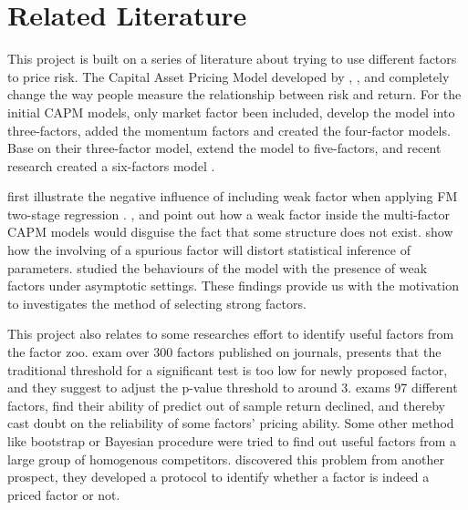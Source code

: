 \documentclass[12pt]{article}
\begin{document}
	\section{Related Literature}

	This project is built on a series of  literature about trying to use different factors to price risk. 
	The Capital Asset Pricing Model developed by , , and  completely change the way people measure the relationship between risk and return. 
	For the initial CAPM models, only market factor been included,  develop the model into three-factors,  added the momentum factors and created the four-factor models.
	Base on their three-factor model,  extend the model to five-factors, and recent research created a six-factors model \cite{Kelly2019}.

 first illustrate the negative influence of including weak factor when applying FM two-stage regression \cite{Fama1973}. , and  point out how a weak factor inside the multi-factor CAPM models would disguise the fact that some structure does not exist. 
 show how the involving of a spurious factor will distort statistical inference of parameters.
 studied the behaviours of the model with the presence of weak factors under asymptotic settings.
These findings provide us with the motivation to investigates the method of selecting strong factors. 
	
	
	This project also relates to some researches effort to identify useful factors from the factor zoo. 
 exam over 300 factors published on journals, presents that the traditional threshold for a significant test is too low for newly proposed factor, and they suggest to adjust the p-value threshold to around 3. 
 exams 97 different factors, find their ability of predict out of sample return declined, and thereby cast doubt on the reliability of some factors' pricing ability. 
Some other method like bootstrap \cite{Harvey2017} or Bayesian procedure \cite{Barillas2018} were tried to find out useful factors from a large group of homogenous competitors. 
 discovered this problem from another prospect, they developed a protocol to identify whether a factor is indeed a priced factor or not.
\end{document}
